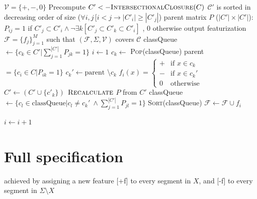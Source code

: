 \documentclass[11pt, oneside]{article}   	%
\begin{document}
\vspace{\baselineskip} \noindent \begin{algorithmic}
	\REQUIRE $\mathcal V = \{ +, -, 0 \}$
	\REQUIRE Precompute $C' <- \textsc{IntersectionalClosure}(C)$
	\REQUIRE $\mathcal C'$ is sorted in decreasing order of size ($\forall i, j \, [i < j \rightarrow |C'_i| \geq |C'_j|$)
	\REQUIRE parent matrix $P$ ($|C'| \times |C'|$): $P_{ij} = 1$ if $C'_j \subset C'_i \land \neg \exists k [C'_j \subset C'_k \subset C'_i]$ , $0$ otherwise
	\ENSURE output featurization $\mathcal F = \{ f_j \}_{j=1}^M$ such that $(\mathcal F, \Sigma, \mathcal V)$ covers $\mathcal C$
	\STATE
	\STATE classQueue $\leftarrow \{c_k \in C' | \sum_{j=1}^{|C'|}P_{jk} = 1 \}$
	\STATE $i \leftarrow 1$
	\STATE
	\STATE $c_k \leftarrow$ \textsc{Pop}(classQueue)
	\STATE parent $ = \{c_i \in C | P_{ik} = 1\}$
	\STATE $c_k' \leftarrow \mbox{parent } \setminus c_k$
	\STATE $f_i(x) = \begin{cases}
	+ & \mbox{if } x \in c_k \\
	- & \mbox{if } x \in c_k' \\
	0 & \mbox{otherwise}
	\end{cases} $
	\STATE $C' \leftarrow (C' \cup \{c'_k\})$
	\STATE $\textsc{Recalculate}$ $ P $ from $C'$
	\STATE classQueue $\leftarrow \{c_l \in \mbox{classQueue} | c_l \not= c_k' \ \land \sum_{j=1}^{|C'|}P_{jl} = 1 \}$
	\STATE \textsc{Sort}(classQueue)
	\STATE $\mathcal F \leftarrow \mathcal F \cup f_i$
	
	\STATE $i \leftarrow i + 1$
	\ENDWHILE
\end{algorithmic}

\section{Full specification}
achieved by assigning a new feature [+f] to every segment in $X$, and [-f] to every segment in $\Sigma \setminus X$
\end{document}
